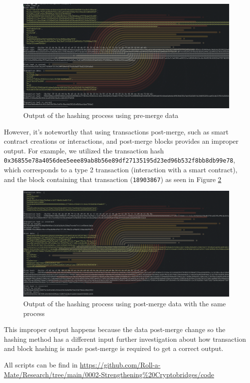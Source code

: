 \documentclass[fleqn,10pt]{olplainarticle}
\begin{document}
\begin{figure}[h]
	\centering
	\includegraphics[width=1\linewidth]{img/HashPreMerge}
	\caption{Output of the hashing process using pre-merge data}
	\label{fig:hashpremerge}
\end{figure}


However, it's noteworthy that using transactions post-merge, such as smart contract creations or interactions, and post-merge blocks provides an improper output. For example, we utilized the transaction hash \texttt{0x36855e78a4056dee5eee89ab8b56e89df27135195d23ed96b532f8bb8db99e78}, which corresponds to a type 2 transaction (interaction with a smart contract), and the block containing that transaction (\texttt{18903867}) as seen in Figure \ref{fig:hashpostmergeerror}

\begin{figure}[h]
	\centering
	\includegraphics[width=1\linewidth]{img/HashPostMergeError}
	\caption{Output of the hashing process using post-merge data with the same process}
	\label{fig:hashpostmergeerror}
\end{figure}

This improper output happens because the data post-merge change so the hashing method has a different input \cite{eth_MergeAnswer_2023} further investigation about how transaction and block hashing is made post-merge is required to get a correct output. 

All scripts can be find in \url{https://github.com/Roll-a-Mate/Research/tree/main/0002-Strengthening%20Cryptobridges/code}


\newpage

\end{document}
